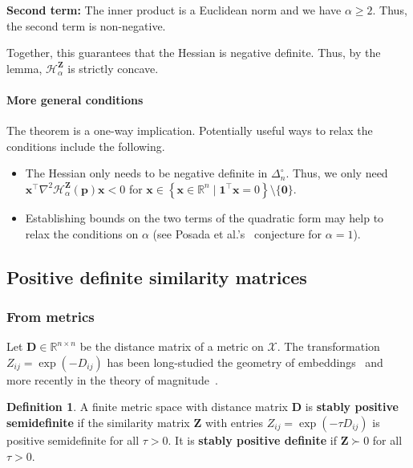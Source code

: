 \documentclass[aps,pre,floats,floatfix,superscriptaddress,twocolumn,final,10pt]{revtex4-2}
\theoremstyle{definition}
\newtheorem{definition}{Definition}
\renewcommand{\vec}[1]{\mathbf{#1}}
\newcommand{\entropy}[3]{\mathcal{H}^{#1}_{#2}\left(#3\right)}
\newcommand{\entropyname}[2]{\mathcal{H}^{#1}_{#2}}
\begin{document}
\textbf{Second term:} The inner product is a Euclidean norm and we have $\alpha\geq 2$. Thus, the second term is non-negative.

Together, this guarantees that the Hessian is negative definite. Thus, by the lemma, $\entropyname{\vec{Z}}{\alpha}$ is strictly concave.

\paragraph*{More general conditions} The theorem is a one-way implication. Potentially useful ways to relax the conditions include the following.
\begin{itemize}[noitemsep,topsep=0pt]
    \item The Hessian only needs to be negative definite in $\Delta_n^\circ$. Thus, we only need $\vec{x}^\top \nabla^2 \entropy{\vec{Z}}{\alpha}{\vec{p}} \vec{x} < 0$ for $\vec{x}\in\left\{ \vec{x}\in\mathbb{R}^n \mid \vec{1}^\top\vec{x}=0 \right\}\setminus\{\vec{0}\}$.
    \item Establishing bounds on the two terms of the quadratic form may help to relax the conditions on $\alpha$ (see Posada et al.'s~\cite{Posada2020} conjecture for $\alpha=1$).
\end{itemize}



\subsection{Positive definite similarity matrices}

\subsubsection{From metrics}
Let $\vec{D}\in \mathbb{R}^{n\times n}$ be the distance matrix of a metric on $\mathcal{X}$. The transformation $Z_{ij}=\exp \left(-D_{ij} \right)$ has been long-studied the geometry of embeddings~\cite{Schoenberg1938} and more recently in the theory of magnitude~\cite{Meckes2013, Leinster2013}.

\begin{definition}
    A finite metric space with distance matrix $\vec{D}$ is \textbf{stably positive semidefinite} if the similarity matrix $\vec{Z}$ with entries $Z_{ij}=\exp \left( -\tau D_{ij} \right)$ is positive semidefinite for all $\tau > 0$.
    It is \textbf{stably positive definite} if $\vec{Z}\succ0$ for all $\tau > 0$.
\end{definition}
\end{document}
